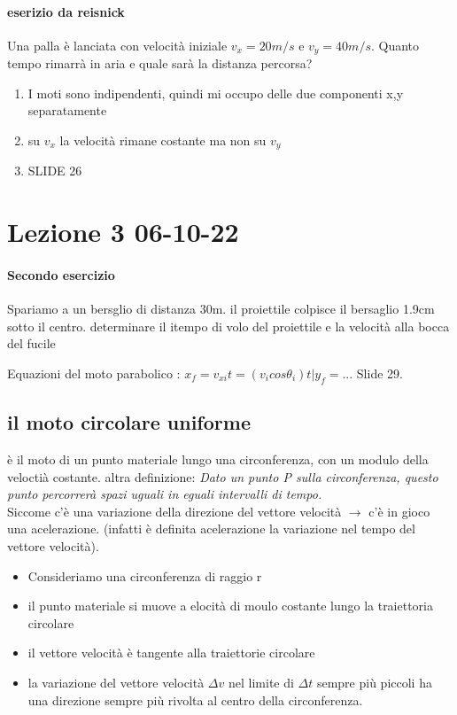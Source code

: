 \documentclass[12pt, a4paper, openany]{book}
\begin{document}
\paragraph*{eserizio da reisnick}
Una palla è lanciata con velocità iniziale $v_x = 20 m/s$ e $v_y=40m/s$. Quanto tempo rimarrà in aria e quale sarà la distanza percorsa?
\begin{enumerate}
    \item I moti sono indipendenti, quindi mi occupo delle due componenti x,y separatamente
    \item su $v_x$ la velocità rimane costante ma non su $v_y$
    \item SLIDE 26 
\end{enumerate}

\section*{Lezione 3 06-10-22}
\paragraph*{Secondo esercizio} Spariamo a un bersglio di distanza 30m. il proiettile colpisce il bersaglio 1.9cm sotto il centro. determinare il itempo di volo del proiettile e la velocità alla bocca del fucile

Equazioni del moto parabolico : $x_f = v_{xi}t = (v_i cos \theta_i) t | y_f = ...$ Slide 29.

\subsection{il moto circolare uniforme} è il moto di un punto materiale lungo una circonferenza, con un modulo della veloctià costante.
altra definizione: \emph{Dato un punto P sulla circonferenza, questo punto percorrerà spazi uguali in eguali intervalli di tempo.}
\\Siccome c'è una variazione della direzione del vettore velocità $\to$ c'è in gioco una acelerazione. (infatti è definita acelerazione la variazione nel tempo del vettore velocità).
\begin{itemize}
    \item Consideriamo una circonferenza di raggio r
    \item il punto materiale si muove a elocità di moulo costante lungo la traiettoria circolare
    \item il vettore velocità è tangente alla traiettorie circolare
    \item la variazione del vettore velocità $\Delta v$ nel limite di $\Delta t$ sempre più piccoli ha una direzione sempre più rivolta al centro della circonferenza.
\end{itemize}
\end{document}
